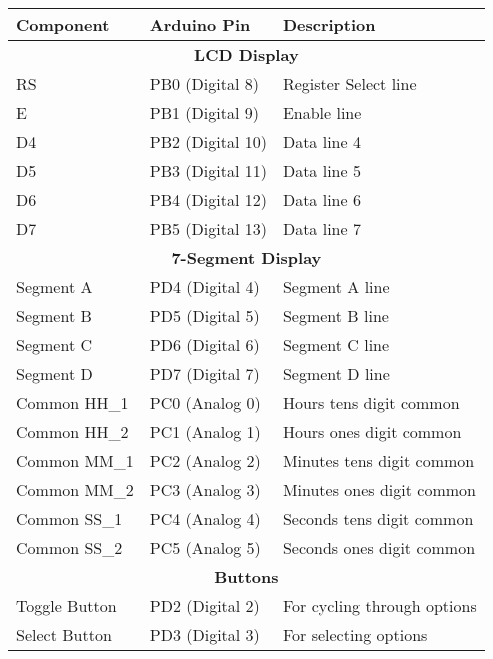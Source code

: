 \begin{tabular}{|l|l|l|}
\hline
\textbf{Component} & \textbf{Arduino Pin} & \textbf{Description} \\
\hline
\multicolumn{3}{|c|}{\textbf{LCD Display}} \\
\hline
RS & PB0 (Digital 8) & Register Select line \\
\hline
E & PB1 (Digital 9) & Enable line \\
\hline
D4 & PB2 (Digital 10) & Data line 4 \\
\hline
D5 & PB3 (Digital 11) & Data line 5 \\
\hline
D6 & PB4 (Digital 12) & Data line 6 \\
\hline
D7 & PB5 (Digital 13) & Data line 7 \\
\hline
\multicolumn{3}{|c|}{\textbf{7-Segment Display}} \\
\hline
Segment A & PD4 (Digital 4) & Segment A line \\
\hline
Segment B & PD5 (Digital 5) & Segment B line \\
\hline
Segment C & PD6 (Digital 6) & Segment C line \\
\hline
Segment D & PD7 (Digital 7) & Segment D line \\
\hline
Common HH\_1 & PC0 (Analog 0) & Hours tens digit common \\
\hline
Common HH\_2 & PC1 (Analog 1) & Hours ones digit common \\
\hline
Common MM\_1 & PC2 (Analog 2) & Minutes tens digit common \\
\hline
Common MM\_2 & PC3 (Analog 3) & Minutes ones digit common \\
\hline
Common SS\_1 & PC4 (Analog 4) & Seconds tens digit common \\
\hline
Common SS\_2 & PC5 (Analog 5) & Seconds ones digit common \\
\hline
\multicolumn{3}{|c|}{\textbf{Buttons}} \\
\hline
Toggle Button & PD2 (Digital 2) & For cycling through options \\
\hline
Select Button & PD3 (Digital 3) & For selecting options \\
\hline
\end{tabular}